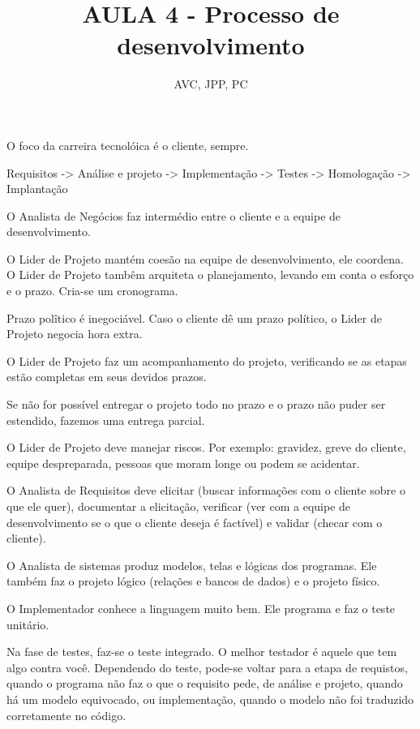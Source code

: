\documentclass[
	12pt, %
]{fphw}
\title{AULA 4 - Processo de desenvolvimento} %
\author{AVC, JPP, PC} %
\date{} %
\institute{Pontifícia Universidade Católica do Rio de Janeiro \\ Departamento de Informática} %
\begin{document}
\maketitle %

\begin{doublespace}
O foco da carreira tecnolóica é o cliente, sempre.

Requisitos -> Análise e projeto -> Implementação -> Testes -> Homologação -> Implantação

O Analista de Negócios faz intermédio entre o cliente e a equipe de desenvolvimento.

O Lider de Projeto mantém coesão na equipe de desenvolvimento, ele coordena. O Lider de Projeto tambêm arquiteta o planejamento, levando em conta o esforço e o prazo. Cria-se um cronograma.

Prazo polîtico é inegociável. Caso o cliente dê um prazo político, o Lider de Projeto negocia hora extra. 

O Lider de Projeto faz um acompanhamento do projeto, verificando se as etapas estão completas em seus devidos prazos.

Se não for possível entregar o projeto todo no prazo e o prazo não puder ser estendido, fazemos uma entrega parcial.

O Lider de Projeto deve manejar riscos. Por exemplo: gravidez, greve do cliente, equipe despreparada, pessoas que moram longe ou podem se acidentar.

O Analista de Requisitos deve elicitar (buscar informações com o cliente sobre o que ele quer), documentar a elicitação, verificar (ver com a equipe de desenvolvimento se o que o cliente deseja é factível) e validar (checar com o cliente).

O Analista de sistemas produz modelos, telas e lógicas dos programas. Ele também faz o projeto lógico (relações e bancos de dados) e o projeto físico.

O Implementador conhece a linguagem muito bem. Ele programa e faz o teste unitário.

Na fase de testes, faz-se o teste integrado. O melhor testador é aquele que tem algo contra você. Dependendo do teste, pode-se voltar para a etapa de requistos, quando o programa não faz o que o requisito pede, de análise e projeto, quando há um modelo equivocado, ou implementação, quando o modelo não foi traduzido corretamente no código.


\end{doublespace}
\end{document}
